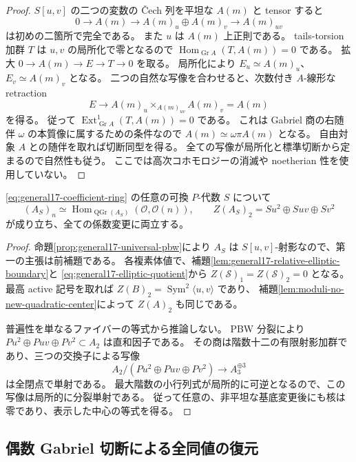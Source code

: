 \begin{proof}
$S[u,v]$ の二つの変数の Čech 列を平坦な $A(m)$ と tensor すると
\[
 0\longrightarrow A(m)\longrightarrow A(m)_u\oplus A(m)_v
     \longrightarrow A(m)_{uv}
\]
は初めの二箇所で完全である。
また $u$ は $A(m)$ 上正則である。
tails-torsion 加群 $T$ は $u,v$ の局所化で零となるので
$\operatorname{Hom}_{\operatorname{Gr}A}(T,A(m))=0$ である。
拡大 $0\to A(m)\to E\to T\to0$ を取る。
局所化により $E_u\simeq A(m)_u$、$E_v\simeq A(m)_v$ となる。
二つの自然な写像を合わせると、次数付き $A$-線形な retraction
\[
 E\longrightarrow A(m)_u\mathop{\times}_{A(m)_{uv}}A(m)_v=A(m)
\]
を得る。
従って $\operatorname{Ext}^1_{\operatorname{Gr}A}(T,A(m))=0$ である。
これは Gabriel 商の右随伴 $\omega$ の本質像に属するための条件なので
$A(m)\simeq\omega\pi A(m)$ となる。
自由対象 $A$ との随伴を取れば切断同型を得る。
全ての写像が局所化と標準切断から定まるので自然性も従う。
ここでは高次コホモロジーの消滅や noetherian 性を使用していない。
\end{proof}

\begin{proposition}[任意係数上の切断と二次中心]
\label{prop:general17-universal-saturation-center}
\eqref{eq:general17-coefficient-ring} の任意の可換 $P$-代数 $S$ について
\[
 (A_S)_n\simeq
 \operatorname{Hom}_{\operatorname{QGr}(A_S)}(\mathcal O,\mathcal O(n)),
 \qquad
 Z(A_S)_2=S u^2\oplus S uv\oplus S v^2
\]
が成り立ち、全ての係数変更に両立する。
\end{proposition}

\begin{proof}
命題\ref{prop:general17-universal-pbw}により
$A_S$ は $S[u,v]$-射影なので、第一の主張は前補題である。
各複素体値で、補題\ref{lem:general17-relative-elliptic-boundary}と
\eqref{eq:general17-elliptic-quotient}から
$Z(\mathscr S)_1=Z(\mathscr S)_2=0$ となる。
最高 active 記号を取れば $Z(B)_2=\operatorname{Sym}^2\langle u,v\rangle$ であり、
補題\ref{lem:moduli-no-new-quadratic-center}によって $Z(A)_2$ も同じである。

普遍性を単なるファイバーの等式から推論しない。
PBW 分裂により $P u^2\oplus Puv\oplus Pv^2\subset A_2$ は直和因子である。
その商は階数十二の有限射影加群であり、三つの交換子による写像
\[
 A_2/(P u^2\oplus Puv\oplus Pv^2)\longrightarrow A_3^{\oplus3}
\]
は全閉点で単射である。
最大階数の小行列式が局所的に可逆となるので、この写像は局所的に分裂単射である。
従って任意の、非平坦な基底変更後にも核は零であり、表示した中心の等式を得る。
\end{proof}

\subsection{偶数 Gabriel 切断による全同値の復元}

